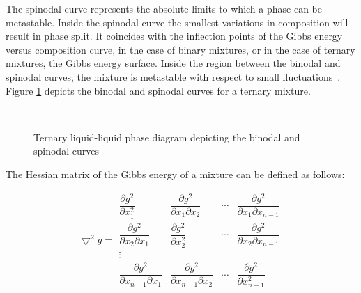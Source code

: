 The spinodal curve represents the absolute limits to which a phase can be metastable. Inside the spinodal curve the smallest variations in composition will result in phase split. It coincides with the inflection points of the Gibbs energy versus composition curve, in the case of binary mixtures, or in the case of ternary mixtures, the Gibbs energy surface. Inside the region between the binodal and spinodal curves, the mixture is metastable with respect to small fluctuations~\cite{ChemicalBiochemicalEngineeringThermodynamics}.\\

Figure \ref{BinodalSpinodalDrawing} depicts the binodal and spinodal curves for a ternary mixture.\\

\begin{figure}[t]
\begin{center}
\resizebox{0.7\textwidth}{!}{}\\
\end{center}
\caption{Ternary liquid-liquid phase diagram depicting the binodal and spinodal curves} \label{BinodalSpinodalDrawing}
\end{figure}	

The Hessian matrix of the Gibbs energy of a mixture can be defined as follows:\

\begin{equation}
\bigtriangledown^{2} g = \begin{array}{|cccc|}
  \dfrac{\partial g^{2}}{\partial x_{1}^{2}} & \dfrac{\partial g^{2}}{\partial x_{1}\partial x_{2}} & \cdots & \dfrac{\partial g^{2}}{\partial x_{1}\partial x_{n-1}} \\
  \dfrac{\partial g^{2}}{\partial x_{2}\partial x_{1}} & \dfrac{\partial g^{2}}{\partial x_{2}^{2}} & \cdots & \dfrac{\partial g^{2}}{\partial x_{2}\partial x_{n-1}} \\
  \vdots & & & \\
  \dfrac{\partial g^{2}}{\partial x_{n-1}\partial x_{1}} & \dfrac{\partial g^{2}}{\partial x_{n-1}\partial x_{2}} & \cdots & \dfrac{\partial g^{2}}{\partial x_{n-1}^{2}}
\end{array}
\end{equation}\


